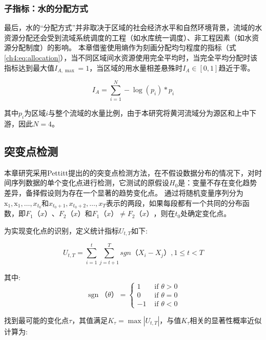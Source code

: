 \subsubsection{子指标：水的分配方式}

最后，水的``分配方式''并非取决于区域的社会经济水平和自然环境背景，流域的水资源分配还会受到流域系统调度的工程（如水库统一调度）、非工程因素（如水资源分配制度）的影响\cite{schmandt2021,speed2013}。
本章借鉴使用熵作为刻画分配均匀程度的指标（式\ref{ch4:eq:allocation}）\cite{peet1974}，当不同区域间水资源使用完全平均时，当完全平均分配时该指标达到最大值$I_{A, \max} = 1$，当区域的用水量相差悬殊时$I_A \in [0, 1]$趋近于零。

\begin{equation}
    I_A = \sum_{i=1}^N - \log(p_{i}) * p_{i}
    \label{ch4:eq:allocation}
\end{equation}

其中$p_{i}$为区域$i$与整个流域的水量比例，由于本研究将黄河流域分为源区和上中下游，因此$N=4$。

\subsection{突变点检测}

本章研究采用Pettitt提出的的突变点检测方法，在不假设数据分布的情况下，对时间序列数据的单个变化点进行检测\cite{pettitt1979}，它测试的原假设$H_0$是：变量不存在变化趋势差异，备择假设则为存在一个显著的趋势变化点。
通过将随机变量序列分为$\mathrm{x}_{1}, \mathrm{x}_{1}, \ldots, x_{t_{0}}$和$x_{t_{0}+1}, x_{t_{0}+2}, \ldots, x_{T}$表示的两段，如果每段都有一个共同的分布函数，即$F_1（x）$、$F_2（x）$和$F_1（x） \neq F_2（x）$，则在$t_0$处确定变化点。

为实现变化点的识别，定义统计指标$U_{t,T}$如下:

\begin{equation}
    U_{t, T} = \sum_{i=1}^t\sum_{j=t+1}^T sgn（X_i - X_j）, 1 \leq t < T
\end{equation}

其中:
\begin{equation}
    \operatorname{sgn}（\theta）= \begin{cases}1 & \text { if } \theta>0 \\ 0 & \text { if } \theta=0 \\ -1 & \text { if } \theta<0\end{cases}
\end{equation}

找到最可能的变化点$\tau$，其值满足$K_{\tau} = \max|U_{t, T}|$，与值$K_{\tau}$相关的显著性概率近似计算为:

